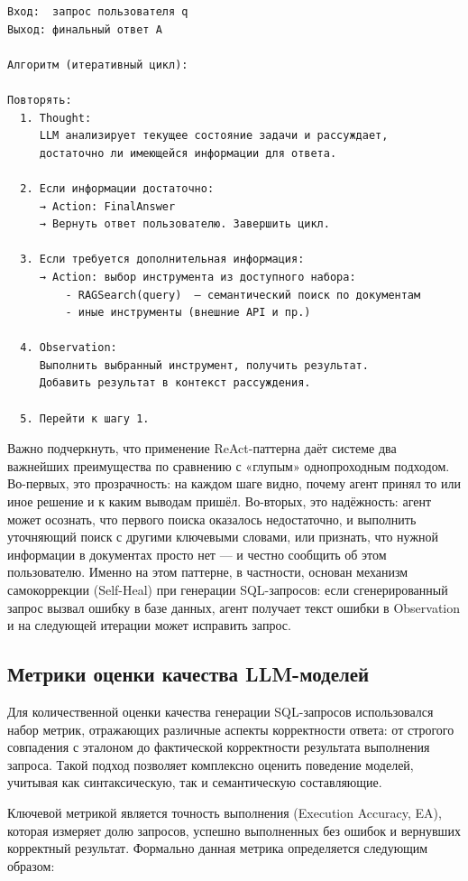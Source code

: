 \begin{verbatim}
Вход:  запрос пользователя q
Выход: финальный ответ A

Алгоритм (итеративный цикл):

Повторять:
  1. Thought:
     LLM анализирует текущее состояние задачи и рассуждает,
     достаточно ли имеющейся информации для ответа.

  2. Если информации достаточно:
     → Action: FinalAnswer
     → Вернуть ответ пользователю. Завершить цикл.

  3. Если требуется дополнительная информация:
     → Action: выбор инструмента из доступного набора:
         - RAGSearch(query)  — семантический поиск по документам
         - иные инструменты (внешние API и пр.)

  4. Observation:
     Выполнить выбранный инструмент, получить результат.
     Добавить результат в контекст рассуждения.

  5. Перейти к шагу 1.
\end{verbatim}

Важно подчеркнуть, что применение ReAct-паттерна даёт системе два важнейших преимущества по сравнению с «глупым» однопроходным подходом. Во-первых, это прозрачность: на каждом шаге видно, почему агент принял то или иное решение и к каким выводам пришёл. Во-вторых, это надёжность: агент может осознать, что первого поиска оказалось недостаточно, и выполнить уточняющий поиск с другими ключевыми словами, или признать, что нужной информации в документах просто нет — и честно сообщить об этом пользователю. Именно на этом паттерне, в частности, основан механизм самокоррекции (Self-Heal) при генерации SQL-запросов: если сгенерированный запрос вызвал ошибку в базе данных, агент получает текст ошибки в Observation и на следующей итерации может исправить запрос.


\subsection{Метрики оценки качества LLM-моделей}

Для количественной оценки качества генерации SQL-запросов использовался набор метрик, отражающих различные аспекты корректности ответа: от строгого совпадения с эталоном до фактической корректности результата выполнения запроса. Такой подход позволяет комплексно оценить поведение моделей, учитывая как синтаксическую, так и семантическую составляющие.

Ключевой метрикой является точность выполнения (Execution Accuracy, EA), которая измеряет долю запросов, успешно выполненных без ошибок и вернувших корректный результат. Формально данная метрика определяется следующим образом:

